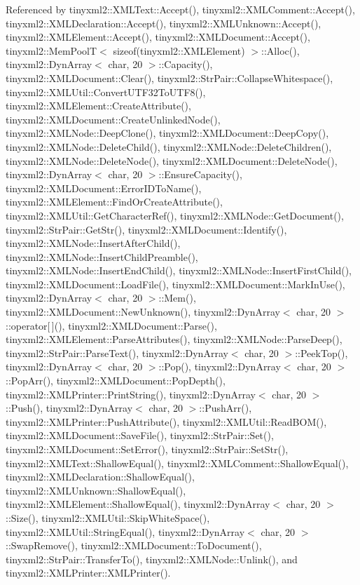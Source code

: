 Referenced by tinyxml2\+::\+X\+M\+L\+Text\+::\+Accept(), tinyxml2\+::\+X\+M\+L\+Comment\+::\+Accept(), tinyxml2\+::\+X\+M\+L\+Declaration\+::\+Accept(), tinyxml2\+::\+X\+M\+L\+Unknown\+::\+Accept(), tinyxml2\+::\+X\+M\+L\+Element\+::\+Accept(), tinyxml2\+::\+X\+M\+L\+Document\+::\+Accept(), tinyxml2\+::\+Mem\+Pool\+T$<$ sizeof(tinyxml2\+::\+X\+M\+L\+Element) $>$\+::\+Alloc(), tinyxml2\+::\+Dyn\+Array$<$ char, 20 $>$\+::\+Capacity(), tinyxml2\+::\+X\+M\+L\+Document\+::\+Clear(), tinyxml2\+::\+Str\+Pair\+::\+Collapse\+Whitespace(), tinyxml2\+::\+X\+M\+L\+Util\+::\+Convert\+U\+T\+F32\+To\+U\+T\+F8(), tinyxml2\+::\+X\+M\+L\+Element\+::\+Create\+Attribute(), tinyxml2\+::\+X\+M\+L\+Document\+::\+Create\+Unlinked\+Node(), tinyxml2\+::\+X\+M\+L\+Node\+::\+Deep\+Clone(), tinyxml2\+::\+X\+M\+L\+Document\+::\+Deep\+Copy(), tinyxml2\+::\+X\+M\+L\+Node\+::\+Delete\+Child(), tinyxml2\+::\+X\+M\+L\+Node\+::\+Delete\+Children(), tinyxml2\+::\+X\+M\+L\+Node\+::\+Delete\+Node(), tinyxml2\+::\+X\+M\+L\+Document\+::\+Delete\+Node(), tinyxml2\+::\+Dyn\+Array$<$ char, 20 $>$\+::\+Ensure\+Capacity(), tinyxml2\+::\+X\+M\+L\+Document\+::\+Error\+I\+D\+To\+Name(), tinyxml2\+::\+X\+M\+L\+Element\+::\+Find\+Or\+Create\+Attribute(), tinyxml2\+::\+X\+M\+L\+Util\+::\+Get\+Character\+Ref(), tinyxml2\+::\+X\+M\+L\+Node\+::\+Get\+Document(), tinyxml2\+::\+Str\+Pair\+::\+Get\+Str(), tinyxml2\+::\+X\+M\+L\+Document\+::\+Identify(), tinyxml2\+::\+X\+M\+L\+Node\+::\+Insert\+After\+Child(), tinyxml2\+::\+X\+M\+L\+Node\+::\+Insert\+Child\+Preamble(), tinyxml2\+::\+X\+M\+L\+Node\+::\+Insert\+End\+Child(), tinyxml2\+::\+X\+M\+L\+Node\+::\+Insert\+First\+Child(), tinyxml2\+::\+X\+M\+L\+Document\+::\+Load\+File(), tinyxml2\+::\+X\+M\+L\+Document\+::\+Mark\+In\+Use(), tinyxml2\+::\+Dyn\+Array$<$ char, 20 $>$\+::\+Mem(), tinyxml2\+::\+X\+M\+L\+Document\+::\+New\+Unknown(), tinyxml2\+::\+Dyn\+Array$<$ char, 20 $>$\+::operator[$\,$](), tinyxml2\+::\+X\+M\+L\+Document\+::\+Parse(), tinyxml2\+::\+X\+M\+L\+Element\+::\+Parse\+Attributes(), tinyxml2\+::\+X\+M\+L\+Node\+::\+Parse\+Deep(), tinyxml2\+::\+Str\+Pair\+::\+Parse\+Text(), tinyxml2\+::\+Dyn\+Array$<$ char, 20 $>$\+::\+Peek\+Top(), tinyxml2\+::\+Dyn\+Array$<$ char, 20 $>$\+::\+Pop(), tinyxml2\+::\+Dyn\+Array$<$ char, 20 $>$\+::\+Pop\+Arr(), tinyxml2\+::\+X\+M\+L\+Document\+::\+Pop\+Depth(), tinyxml2\+::\+X\+M\+L\+Printer\+::\+Print\+String(), tinyxml2\+::\+Dyn\+Array$<$ char, 20 $>$\+::\+Push(), tinyxml2\+::\+Dyn\+Array$<$ char, 20 $>$\+::\+Push\+Arr(), tinyxml2\+::\+X\+M\+L\+Printer\+::\+Push\+Attribute(), tinyxml2\+::\+X\+M\+L\+Util\+::\+Read\+B\+O\+M(), tinyxml2\+::\+X\+M\+L\+Document\+::\+Save\+File(), tinyxml2\+::\+Str\+Pair\+::\+Set(), tinyxml2\+::\+X\+M\+L\+Document\+::\+Set\+Error(), tinyxml2\+::\+Str\+Pair\+::\+Set\+Str(), tinyxml2\+::\+X\+M\+L\+Text\+::\+Shallow\+Equal(), tinyxml2\+::\+X\+M\+L\+Comment\+::\+Shallow\+Equal(), tinyxml2\+::\+X\+M\+L\+Declaration\+::\+Shallow\+Equal(), tinyxml2\+::\+X\+M\+L\+Unknown\+::\+Shallow\+Equal(), tinyxml2\+::\+X\+M\+L\+Element\+::\+Shallow\+Equal(), tinyxml2\+::\+Dyn\+Array$<$ char, 20 $>$\+::\+Size(), tinyxml2\+::\+X\+M\+L\+Util\+::\+Skip\+White\+Space(), tinyxml2\+::\+X\+M\+L\+Util\+::\+String\+Equal(), tinyxml2\+::\+Dyn\+Array$<$ char, 20 $>$\+::\+Swap\+Remove(), tinyxml2\+::\+X\+M\+L\+Document\+::\+To\+Document(), tinyxml2\+::\+Str\+Pair\+::\+Transfer\+To(), tinyxml2\+::\+X\+M\+L\+Node\+::\+Unlink(), and tinyxml2\+::\+X\+M\+L\+Printer\+::\+X\+M\+L\+Printer().

